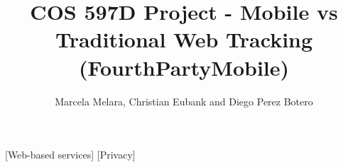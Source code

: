 \documentclass{acm_proc_article-sp}
\begin{document}
\newcommand{\pp}{privacy policy}
\newcommand{\pps}{privacy policies}

\title{COS 597D Project - Mobile vs Traditional Web Tracking\\(FourthPartyMobile)}
%
%
%
%
%

%
\author{
%
%
\alignauthor
Marcela Melara, Christian Eubank and Diego Perez Botero \\ 
}

\maketitle

[Web-based services]
[Privacy]
\end{document}
